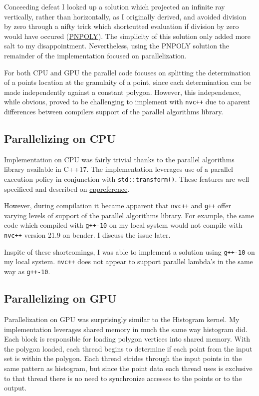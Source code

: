\documentclass{article}
\begin{document}
Conceeding defeat I looked up a solution which projected an infinite ray vertically, rather than horizontally, as I originally derived, and avoided division by zero through a nifty trick which shortcutted evaluation if division by zero would have occured (\href{https://wrf.ecse.rpi.edu/Research/Short_Notes/pnpoly.html}{PNPOLY}). The simplicity of this solution only added more salt to my disappointment. Nevertheless, using the PNPOLY solution the remainder of the implementation focused on parallelization.

For both CPU and GPU the parallel code focuses on splitting the determination of a points location at the granulaity of a point, since each determination can be made independently against a constant polygon. However, this independence, while obvious, proved to be challenging to implement with \texttt{nvc++} due to aparent differences between compilers support of the parallel algorithms library.

\subsection{Parallelizing on CPU}
Implementation on CPU was fairly trivial thanks to the parallel algorithms library available in C++17. The implementation leverages use of a parallel execution policy in conjunction with \texttt{std::transform()}.  These features are well specificed and described on \href{https://en.cppreference.com/w/cpp/algorithm/execution_policy_tag_t}{cppreference}. 

However, during compilation it became apparent that \texttt{nvc++} and \texttt{g++} offer varying levels of support of the parallel algorithms library. For example, the same code which compiled with \texttt{g++-10} on my local system would not compile with \texttt{nvc++} version 21.9 on bender. I discuss the issue later.

Inspite of these shortcomings, I was able to implement a solution using \texttt{g++-10} on my local system. \texttt{nvc++} does not appear to support parallel lambda's in the same way as \texttt{g++-10}.

\subsection{Parallelizing on GPU}
Parallelization on GPU was surprisingly similar to the Histogram kernel. My implementation leverages shared memory in much the same way histogram did. Each block is responsible for loading polygon vertices into shared memory. With the polygon loaded, each thread begins to determine if each point from the input set is within the polygon. Each thread strides through the input points in the same pattern as histogram, but since the point data each thread uses is exclusive to that thread there is no need to synchronize accesses to the points or to the output. 
\end{document}
